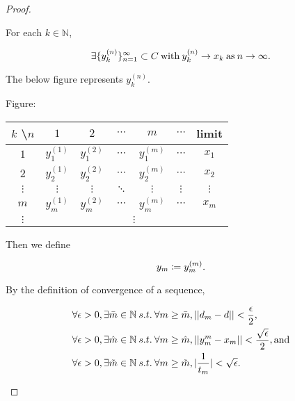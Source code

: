 \documentclass[a4paper,11pt]{jsarticle}
\newcommand{\NaturalNumberSet}{\mathbb{N}}
\begin{document}
\begin{proof}
\begin{enumerate}[label=\roman*,align=CenterWithParen]
\begin{enumerate}[label=ii-\alph*,align=CenterWithParen2]
        For each $k \in \NaturalNumberSet$,

        \begin{equation}
          \exists \{y_k^{(n)}\}_{n=1}^{\infty} \subset C \:\text{with}\: y_k^{(n)} \rightarrow x_k \:\text{as}\: n \rightarrow \infty. \notag
        \end{equation}

        The below figure represents $y_k^{(n)}$.
        \medskip

        Figure:

        \medskip

        \begin{center}
          \large
          \begin{tabular}{|c|c|c|c|c|c|c|} \hline
            $k$ \textbackslash $n$ & $1$ & $2$ & $\cdots$ & $m$ & $\cdots$ & limit \\ \hline
            $1$ & $y_1^{(1)}$ & $y_1^{(2)}$ & $\cdots$ & $y_1^{(m)}$ & $\cdots$ & $x_{1}$ \\
            $2$ & $y_2^{(1)}$ & $y_2^{(2)}$ & $\cdots$ & $y_2^{(m)}$& $\cdots$ & $x_{2}$ \\
            $\vdots$ & $\vdots$ & $\vdots$ & $\ddots$ & $\vdots$ & $\vdots$ & $\vdots$ \\
            $m$ & $y_m^{(1)}$ & $y_m^{(2)}$ & $\cdots$ & $y_m^{(m)}$ & $\cdots$ & $x_{m}$ \\
            $\vdots$ & \multicolumn{6}{|c|}{$\vdots$} \\ \hline
          \end{tabular}
        \end{center}

        \medskip

        Then we define

        \begin{equation}
          y_m \coloneqq y_m^{(m)}. \notag
        \end{equation}

        By the definition of convergence of a sequence,

        \begin{equation}
          \begin{split}
            \forall \epsilon &> 0, \exists \bar{m} \in \NaturalNumberSet \:s.t.\: \forall m \geq \bar{m}, ||d_m -d|| < \frac{\epsilon}{2}, \\
            \forall \epsilon &> 0, \exists \hat{m} \in \NaturalNumberSet \:s.t.\: \forall m \geq \hat{m}, ||y_m^{m} -x_m|| < \frac{\sqrt{\epsilon}}{2}, \text{and} \\
            \forall \epsilon &> 0, \exists \tilde{m} \in \NaturalNumberSet \:s.t.\: \forall m \geq \tilde{m}, |\frac{1}{t_m}| < \sqrt{\epsilon}. \notag
          \end{split}
        \end{equation}


\end{enumerate}
\end{enumerate}
\end{proof}
\end{document}
